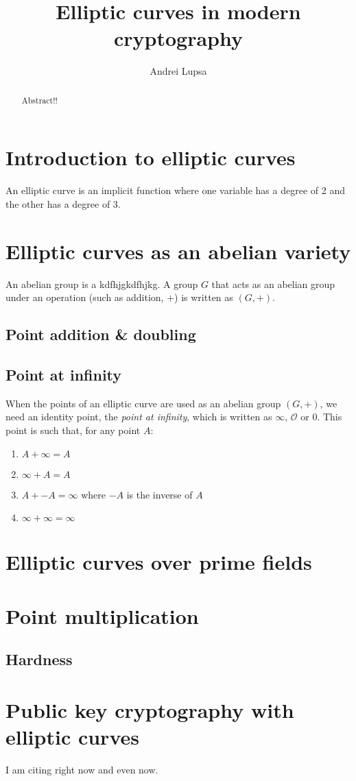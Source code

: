 \documentclass[a4paper]{article}
\title{Elliptic curves in modern cryptography}
\author{Andrei Lupsa}
\begin{document}
\maketitle

\begin{abstract}
Abstract!!
\end{abstract}


\section{Introduction to elliptic curves}

An elliptic curve is an implicit function where one variable has a degree of 2 and the other has a degree of 3. 


\section{Elliptic curves as an abelian variety}

An abelian group is a kdfhjgkdfhjkg. A group $G$ that acts as an abelian group under an operation (such as addition, $+$) is written as $(G, +)$.

\subsection{Point addition \& doubling}

\subsection{Point at infinity}

When the points of an elliptic curve are used as an abelian group $(G, +)$, we need an identity point, the \emph{point at infinity}, which is written as $\infty$, $\mathcal{O}$ or $0$. This point is such that, for any point $A$:

\begin{enumerate}
    \item $A + \infty = A$
    \item $\infty + A = A$
    \item $A + -A = \infty$ where $-A$ is the inverse of $A$
    \item $\infty + \infty = \infty$
\end{enumerate}


\section{Elliptic curves over prime fields}


\section{Point multiplication}

\subsection{Hardness}


\section{Public key cryptography with elliptic curves}

I am citing right now\cite[3-4]{greenwade93} and even now\cite[5-6]{greenwade93}.

\newpage


\end{document}
